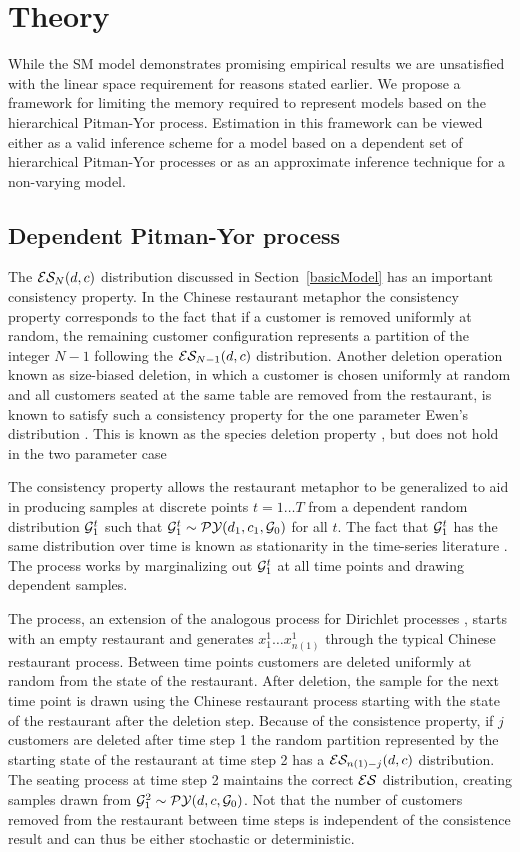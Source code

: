 \section{Theory}

While the SM model demonstrates promising empirical results \cite{Gasthaus} we are unsatisfied with the linear space requirement for reasons stated earlier.  We propose a framework for limiting the memory required to represent models based on the hierarchical Pitman-Yor process.  Estimation in this framework can be viewed either as a valid inference scheme for a model based on a dependent set of hierarchical Pitman-Yor processes or as an approximate inference technique for a non-varying model.

\subsection{Dependent Pitman-Yor process} 

The $\ES_N(d,c)$ distribution discussed in Section~\ref{basicModel} has an important consistency property. In the Chinese restaurant metaphor the consistency property corresponds to the fact that if a customer is removed uniformly at random, the remaining customer configuration represents a partition of the integer $N-1$ following the $\ES_{N-1}(d,c)$ distribution. Another deletion operation known as size-biased deletion, in which a customer is chosen uniformly at random and all customers seated at the same table are removed from the restaurant, is known to satisfy such a consistency property for the one parameter Ewen's distribution \cite{kingman}.  This is known as the species deletion property \cite{kingman}, but does not hold in the two parameter case \cite{pitman}

The consistency property allows the restaurant metaphor to be generalized to aid in producing samples at discrete points $t = 1 \dots T$ from a dependent random distribution $\G^t_1$ such that $\G^t_1 \sim \PY(d_1, c_1, \G_0)$ for all $t$.   The fact that $\G^t_1$ has the same distribution over time is known as stationarity in the time-series literature \cite{davis and brockwel?}.  The process works by marginalizing out $\G^t_1$ at all time points and drawing dependent samples.

The process, an extension of the analogous process for Dirichlet processes \cite{caron}, starts with an empty restaurant and generates $x^1_1 \dots x^1_{n(1)}$ through the typical Chinese restaurant process.  Between time points customers are deleted uniformly at random from the state of the restaurant.  After deletion, the sample for the next time point is drawn using the Chinese restaurant process starting with the state of the restaurant after the deletion step.  Because of the consistence property, if $j$ customers are deleted after time step 1 the random partition represented by the starting state of the restaurant at time step 2 has a $\ES_{n(1) - j}(d,c)$ distribution.  The seating process at time step 2 maintains the correct $\ES$ distribution, creating samples drawn from $\G^2_1 \sim \PY(d,c,\G_0)$.  Not that the number of customers removed from the restaurant between time steps is independent of the consistence result and can thus be either stochastic or deterministic.

